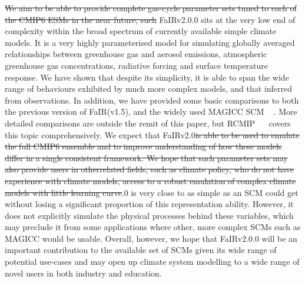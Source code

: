 \documentclass[gmd, manuscript]{copernicus}
\providecommand{\DIFadd}[1]{{\protect\color{blue}#1}} %
\providecommand{\DIFdel}[1]{{\protect\color{red}\sout{#1}}}                      %
\providecommand{\DIFaddbegin}{} %
\providecommand{\DIFaddend}{} %
\providecommand{\DIFdelbegin}{} %
\providecommand{\DIFdelend}{} %
\begin{document}
%
\DIFdelbegin \DIFdel{We aim to be able to provide complete gas-cycle parameter sets tuned to each of the CMIP6 ESMs in the near future, such }\DIFdelend \DIFaddbegin \DIFadd{FaIRv2.0.0 sits at the very low end of complexity within the broad spectrum of currently available simple climate models. It is a very highly parameterised model for simulating globally averaged relationships between greenhouse gas and aerosol emissions, atmospheric greenhouse gas concentrations, radiative forcing and surface temperature response. We have shown that despite its simplicity, it is able to span the wide range of behaviours exhibited by much more complex models, and that inferred from observations. In addition, we have provided some basic comparisons to both the previous version of FaIR(v1.5), and the widely used MAGICC SCM  \mbox{%
\citep{Meinshausen2011,Meinshausen2011b,Meinshausen2019}}\hspace{0pt}%
. More detailed comparisons are outside the remit of this paper, but RCMIP \mbox{%
\citep{Nicholls2020,Nicholls2019} }\hspace{0pt}%
covers this topic comprehensively. We expect }\DIFaddend that FaIRv2.0\DIFdelbegin \DIFdel{is able to be used to emulate the full CMIP6 ensemble and to improve understanding of how these models differ in a single consistent framework.  We hope that such parameter sets may also provide users in otherrelated fields, such as climate policy, who do not have experience with climate models, access to a robust emulation of complex climate models with little learning curve}\DIFdelend \DIFaddbegin \DIFadd{.0 is very close to as simple as an SCM could get without losing a significant proportion of this representation ability.  However, it does not explicitly simulate the physical processes behind these variables, which may preclude it from some applications where other, more complex SCMs such as MAGICC would be usable. Overall, however, we hope that FaIRv2.0.0 will be an important contribution to the available set of SCMs given its wide range of potential use-cases and may open up climate system modelling to a wide range of novel users in both industry and education}\DIFaddend .


\end{document}
